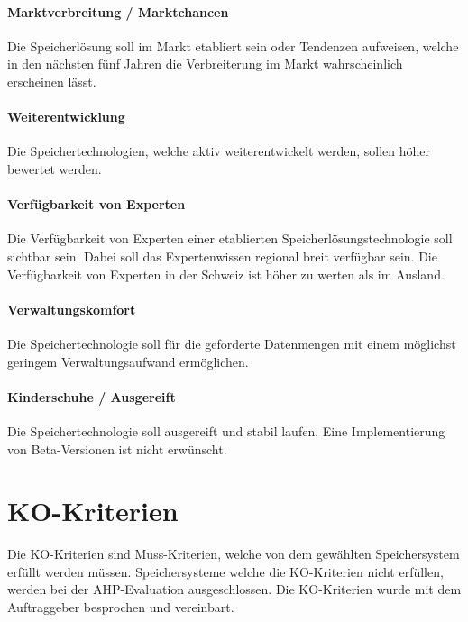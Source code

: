 \setcounter{paragraph}{0}
\renewcommand\theparagraph{Soll-6-\arabic{paragraph}}

\paragraph{Marktverbreitung / Marktchancen}\label{Soll-6-1}
Die Speicherlösung soll im Markt etabliert sein oder Tendenzen aufweisen, welche in den nächsten fünf Jahren die Verbreiterung im Markt wahrscheinlich erscheinen lässt.

\paragraph{Weiterentwicklung}\label{Soll-6-2}
Die Speichertechnologien, welche aktiv weiterentwickelt werden, sollen höher bewertet werden.

\paragraph{Verfügbarkeit von Experten}\label{Soll-6-3}
Die Verfügbarkeit von Experten einer etablierten Speicherlösungstechnologie soll sichtbar sein. Dabei soll das Expertenwissen regional breit verfügbar sein. Die Verfügbarkeit von Experten in der Schweiz ist höher zu werten als im Ausland.

\paragraph{Verwaltungskomfort}\label{Soll-6-4}
Die Speichertechnologie soll für die geforderte Datenmengen mit einem möglichst geringem Verwaltungsaufwand ermöglichen.

\paragraph{Kinderschuhe / Ausgereift}\label{Soll-6-5}
Die Speichertechnologie soll ausgereift und stabil laufen. Eine Implementierung von Beta-Versionen ist nicht erwünscht.

\section{KO-Kriterien}
Die KO-Kriterien sind Muss-Kriterien, welche von dem gewählten Speichersystem erfüllt werden müssen. Speichersysteme welche die KO-Kriterien nicht erfüllen, werden bei der AHP-Evaluation ausgeschlossen. Die KO-Kriterien wurde mit dem Auftraggeber besprochen und vereinbart.

